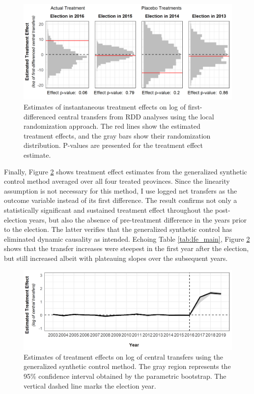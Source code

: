 \documentclass[12pt]{article}
\newcommand{\1}{\mathbbm{1}}
\begin{document}
\begin{figure}[!htbp]
	\centering
	\includegraphics[]{figure/210202_rdd_results.png}
	\captionsetup{singlelinecheck=off}
	\caption[Estimated RDD treatment effects]{Estimates of instantaneous treatment effects on log of first-differenced central transfers from RDD analyses using the local randomization approach. The red lines show the estimated treatment effects, and the gray bars show their randomization distribution. P-values are presented for the treatment effect estimate.}
	\label{fig:rdd_placebo}
\end{figure}

Finally, Figure \ref{fig:synth_placebo} shows treatment effect estimates from the generalized synthetic control method averaged over all four treated provinces. Since the linearity assumption is not necessary for this method, I use logged net transfers as the outcome variable instead of its first difference. The result confirms not only a statistically significant and sustained treatment effect throughout the post-election years, but also the absence of pre-treatment difference in the years prior to the election. The latter verifies that the generalized synthetic control has eliminated dynamic causality as intended. Echoing Table \ref{tab:lfe_main}, Figure \ref{fig:synth_placebo} shows that the transfer increases were steepest in the first year after the election, but still increased albeit with plateauing slopes over the subsequent years.

\begin{figure}[!htbp]
	\centering
	\includegraphics[]{figure/210202_synth_results.png}
	\captionsetup{singlelinecheck=off}
	\caption[Estimated synthetic control treatment effects]{Estimates of treatment effects on log of central transfers using the generalized synthetic control method. The gray region represents the 95\% confidence interval obtained by the parametric bootstrap. The vertical dashed line marks the election year.}
	\label{fig:synth_placebo}
\end{figure}
\end{document}
